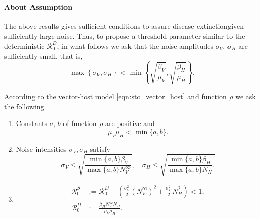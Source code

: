 \paragraph{About Assumption}
The above results gives sufficient conditions to assure 
disease extinction\textemdash given sufficiently large noise. Thus, 
to propose a threshold parameter similar  to the deterministic
$\mathcal{R}_0^D$, in what follows we ask that the noise amplitudes 
$\sigma_V$, $\sigma_H$ are sufficiently small, that is,
\begin{equation}\label{eqn:noise_small_condition}
    \displaystyle
    \max
        \left \{
              \sigma_V, \sigma_H 
        \right\} 
        < 
    \min 
        \left \{
            \sqrt{\frac{\beta_V}{\mu_V}},
            \sqrt{\frac{\beta_H}{\mu_H}}
        \right \}.
\end{equation}
%
%
%
\begin{assumption}\label{ass:extinction}
    According to the vector-host model \eqref{eqn:sto_vector_host} and 
    function
    $\rho$
    we ask the following.
    \begin{enumerate}[\bf{(E\textendash}1)]
        \item 
            Constants $a$, $b$ of function $\rho$ are positive and
            $$
                \mu_V \mu_H < \min \{a, b \}.
            $$
        \item \label{ass:noise_condition}
            Noise intensities $\sigma_V, \sigma_H$ satisfy
            $$
                \sigma_V \leq 
                    \sqrt{
                        \frac{
                            \min\{a, b\}
                            \beta_V
                        }{
                            \max \{a, b \}
                            N_V^{\infty}
                        }
                    },
                 \quad
                \sigma_H \leq
                    \sqrt{
                        \frac{
                            \min\{a, b\}
                            \beta_H
                        }{
                            \max \{a, b \}
                            N_H
                        }.
                    }
            $$
        \item
            \begin{equation*}
                \begin{aligned}
                    \mathcal{R}_0 ^ S &:=
                        \mathcal{R}_0^D - 
                        \left( 
                            \frac{\sigma_V ^ 2}{2} (N_V ^ {\infty}) ^ 2
                            +
                            \frac{\sigma_H ^ 2}{2} N_H ^ 2
                        \right)
                        <1,
                        \\
                    \mathcal{R}_0 ^ D &:=
                            \frac{
                                 \beta_H N_V ^ \infty N_H}{\mu_V \mu_H} .
                \end{aligned}
            \end{equation*}
    \end{enumerate}
\end{assumption}        

